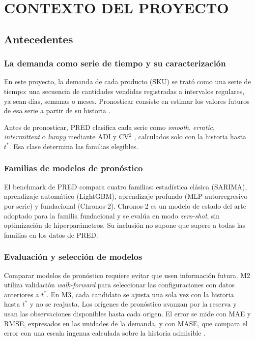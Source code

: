 \setcounter{subsection}{0}
\section{CONTEXTO DEL PROYECTO}

\subsection{Antecedentes}
\subsubsection{La demanda como serie de tiempo y su caracterización}
En este proyecto, la demanda de cada producto (SKU) se trató como una serie de tiempo: una secuencia de cantidades vendidas registradas a intervalos regulares, ya sean días, semanas o meses. Pronosticar consiste en estimar los valores futuros de esa serie a partir de su historia \cite{hyndman}.

Antes de pronosticar, PRED clasifica cada serie como \textit{smooth}, \textit{erratic}, \textit{intermittent} o \textit{lumpy} mediante ADI y CV$^2$ \cite{syntetos2005}, calculados solo con la historia hasta $t^*$. Esa clase determina las familias elegibles.

\subsubsection{Familias de modelos de pronóstico}
El benchmark de PRED compara cuatro familias: estadística clásica (SARIMA), aprendizaje automático (LightGBM), aprendizaje profundo (MLP autorregresivo por serie) y fundacional (Chronos-2). Chronos-2 es un modelo de estado del arte adoptado para la familia fundacional y se evalúa en modo \textit{zero-shot}, sin optimización de hiperparámetros. Su inclusión no supone que supere a todas las familias en los datos de PRED.

\subsubsection{Evaluación y selección de modelos}
Comparar modelos de pronóstico requiere evitar que usen información futura. M2 utiliza validación \textit{walk-forward} para seleccionar las configuraciones con datos anteriores a $t^*$. En M3, cada candidato se ajusta una sola vez con la historia hasta $t^*$ y no se reajusta. Los orígenes de pronóstico avanzan por la reserva y usan las observaciones disponibles hasta cada origen. El error se mide con MAE y RMSE, expresados en las unidades de la demanda, y con MASE, que compara el error con una escala ingenua calculada sobre la historia admisible \cite{hyndmankoehler2006}.

